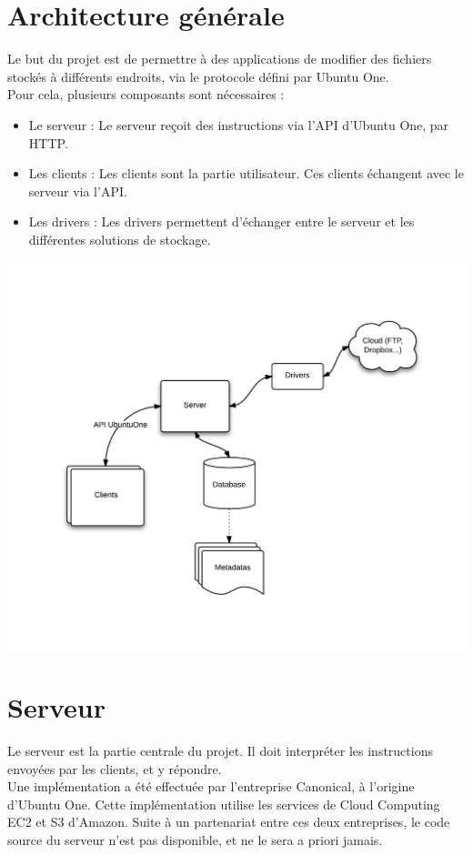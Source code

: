 \section{Architecture générale}
Le but du projet est de permettre à des applications de modifier des fichiers stockés à différents endroits, via le protocole défini par Ubuntu One.\\

Pour cela, plusieurs composants sont nécessaires :
\begin{itemize} 
   \item Le serveur : Le serveur reçoit des instructions via l'API d'Ubuntu One, par HTTP.
   \item Les clients : Les clients sont la partie utilisateur. Ces clients échangent avec le serveur via l'API. 
   \item Les drivers : Les drivers permettent d'échanger entre le serveur et les différentes solutions de stockage. 
\end{itemize}

\includegraphics[width=500pt]{architecture.png}

\section{Serveur}
Le serveur est la partie centrale du projet. Il doit interpréter les instructions envoyées par les clients, et y répondre.\\

Une implémentation a été effectuée par l'entreprise Canonical, à l'origine d'Ubuntu One. Cette implémentation utilise les services de Cloud Computing EC2 et S3 d'Amazon. Suite à un partenariat entre ces deux entreprises, le code source du serveur n'est pas disponible, et ne le sera a priori jamais.\\

